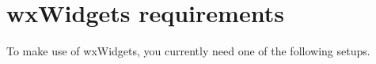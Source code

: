 \begin{comment}
\section{Changes from version 2.0}\label{versionchanges20}

These are a few of the differences between versions 2.0 and 2.2.

Removals:

\begin{itemize}\itemsep=0pt
\item GTK 1.0 no longer supported.
\end{itemize}

Additions and changes:

\begin{itemize}\itemsep=0pt
\item Corrected many classes to conform better to documented behaviour.
\item Added handlers for more image formats (Now GIF, JPEG, PCX, BMP, XPM, PNG, PNM).
\item Improved support for socket and network functions.
\item Support for different national font encodings.
\item Sizer based layout system.
\item HTML widget and help system.
\item Added some controls (e.g. wxSpinCtrl) and supplemented many.
\item Many optical improvements to GTK port.
\item Support for menu accelerators in GTK port.
\item Enhanced and improved support for scrolling, including child windows.
\item Complete rewrite of clipboard and drag and drop classes.
\item Improved support for ODBC databases.
\item Improved tab traversal in dialogs.
\end{itemize}
\end{comment}

\section{wxWidgets requirements}\label{requirements}

To make use of wxWidgets, you currently need one of the following setups.

